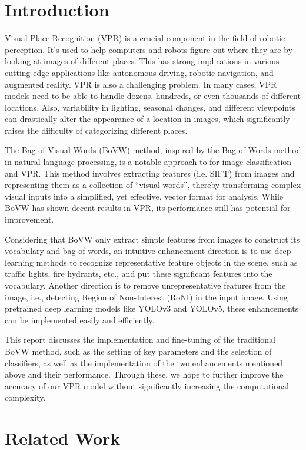 \documentclass[conference]{IEEEtran}
\begin{document}
\section{Introduction}

Visual Place Recognition (VPR) is a crucial component in the field of robotic perception. It's used to help computers and robots figure out where they are by looking at images of different places. This has strong implications in various cutting-edge applications like autonomous driving, robotic navigation, and augmented reality. VPR is also a challenging problem. In many cases, VPR models need to be able to handle dozens, hundreds, or even thousands of different locations. Also, variability in lighting, seasonal changes, and different viewpoints can drastically alter the appearance of a location in images, which significantly raises the difficulty of categorizing different places.

The Bag of Visual Words (BoVW) method, inspired by the Bag of Words method in natural language processing, is a notable approach to for image classification\cite{yang2010bag} and VPR. This method involves extracting features (i.e. SIFT) from images and representing them as a collection of ``visual words'', thereby transforming complex visual inputs into a simplified, yet effective, vector format for analysis. While BoVW has shown decent results in VPR, its performance still has potential for improvement. 

Considering that BoVW only extract simple features from images to construct its vocabulary and bag of words, an intuitive enhancement direction is to use deep learning methods to recognize representative feature objects in the scene, such as traffic lights, fire hydrants, etc., and put these significant features into the vocabulary. Another direction is to remove unrepresentative features from the image, i.e., detecting Region of Non-Interest (RoNI) in the input image. Using pretrained deep learning models like YOLOv3\cite{redmon2018yolov3} and YOLOv5, these enhancements can be implemented easily and efficiently.

This report discusses the implementation and fine-tuning of the traditional BoVW method, such as the setting of key parameters and the selection of classifiers, as well as the implementation of the two enhancements mentioned above and their performance. Through these, we hope to further improve the accuracy of our VPR model without significantly increasing the computational complexity.

\section{Related Work}
\end{document}
